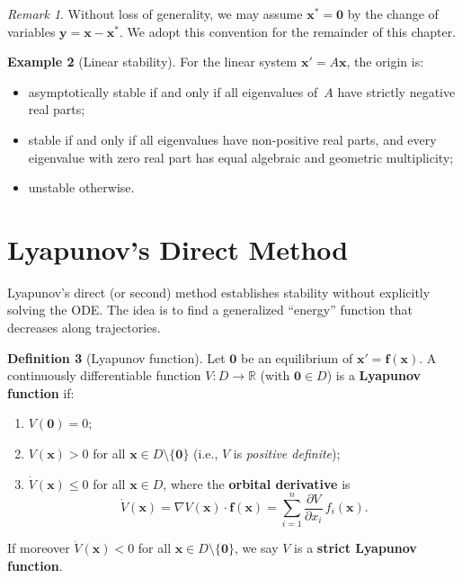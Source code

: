 \documentclass[12pt,a4paper,openany]{book}
\theoremstyle{definition}
\newtheorem{definition}{Definition}[chapter]
\newtheorem{example}[definition]{Example}
\theoremstyle{plain}
\theoremstyle{remark}
\newtheorem{remark}[definition]{Remark}
\newcommand{\R}{\mathbb{R}}
\begin{document}
\begin{remark}
\label{rem:stability-shift}
Without loss of generality, we may assume \(\mathbf{x}^*=\mathbf{0}\) by
the change of variables \(\mathbf{y}=\mathbf{x}-\mathbf{x}^*\). We adopt this
convention for the remainder of this chapter.
\end{remark}

\begin{example}[Linear stability]
\label{ex:linear-stability}
For the linear system \(\mathbf{x}'=A\mathbf{x}\), the origin is:
\begin{itemize}
  \item asymptotically stable if and only if all eigenvalues of~\(A\) have
    strictly negative real parts;
  \item stable if and only if all eigenvalues have non-positive real parts, and
    every eigenvalue with zero real part has equal algebraic and geometric
    multiplicity;
  \item unstable otherwise.
\end{itemize}
\end{example}

\section{Lyapunov's Direct Method}
\label{sec:lyapunov-direct}

Lyapunov's direct (or second) method establishes stability without explicitly
solving the ODE. The idea is to find a generalized ``energy'' function that
decreases along trajectories.

\begin{definition}[Lyapunov function]
\label{def:lyapunov-function}
Let \(\mathbf{0}\) be an equilibrium of \(\mathbf{x}'=\mathbf{f}(\mathbf{x})\).
A continuously differentiable function \(V\colon D\to\R\) (with
\(\mathbf{0}\in D\)) is a \textbf{Lyapunov function} if:
\begin{enumerate}[label=(\roman*)]
  \item \(V(\mathbf{0})=0\);
  \item \(V(\mathbf{x})>0\) for all \(\mathbf{x}\in D\setminus\{\mathbf{0}\}\)
    (i.e., \(V\) is \emph{positive definite});
  \item \(\dot{V}(\mathbf{x}) \le 0\) for all \(\mathbf{x}\in D\), where the
    \textbf{orbital derivative} is
    \begin{equation}\label{eq:orbital-deriv}
      \dot{V}(\mathbf{x}) = \nabla V(\mathbf{x})\cdot\mathbf{f}(\mathbf{x})
      = \sum_{i=1}^n \frac{\partial V}{\partial x_i}\,f_i(\mathbf{x}).
    \end{equation}
\end{enumerate}
If moreover \(\dot{V}(\mathbf{x})<0\) for all \(\mathbf{x}\in D\setminus\{\mathbf{0}\}\),
we say \(V\) is a \textbf{strict Lyapunov function}.
\end{definition}
\end{document}
